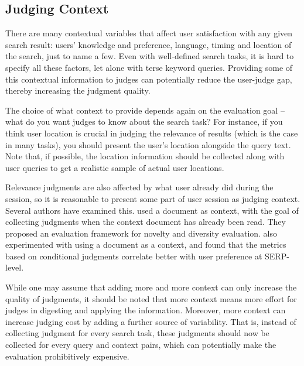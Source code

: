 \subsection{Judging Context}
\label{s:judging-context}
There are many contextual variables that affect user satisfaction with any given search result: users' knowledge and preference, language, timing and location of the search, just to name a few. Even with well-defined search tasks, it is hard to specify all these factors, let alone with terse keyword queries. Providing some of this contextual information to judges can potentially reduce the user-judge gap, thereby increasing the judgment quality.  

The choice of what context to provide depends again on the evaluation goal -- what do you want judges to know about the search task? For instance, if you think user location is crucial in judging the relevance of results (which is the case in many tasks), you should present the user's location alongside the query text. Note that, if possible, the location information should be collected along with user queries to get a realistic sample of actual user locations.

Relevance judgments are also affected by what user already did during the session, so it is reasonable to present some part of user session as judging context. Several authors have examined this.\cite{Chandar2013} used a document as context, with the goal of collecting judgments when the context document has already been read. They proposed an evaluation framework for novelty and diversity evaluation. \cite{Golbus:2014:CDR} also experimented with using a document as a context, and found that the metrics based on conditional judgments correlate better with user preference at SERP-level. 

While one may assume that adding more and more context can only increase the quality of judgments, it should be noted that more context means more effort for judges in digesting and applying the information. Moreover, more context can increase judging cost by adding a further source of variability. That is, instead of collecting judgment for every search task, these judgments should now be collected for every query and context pairs, which can potentially make the evaluation prohibitively expensive. 

